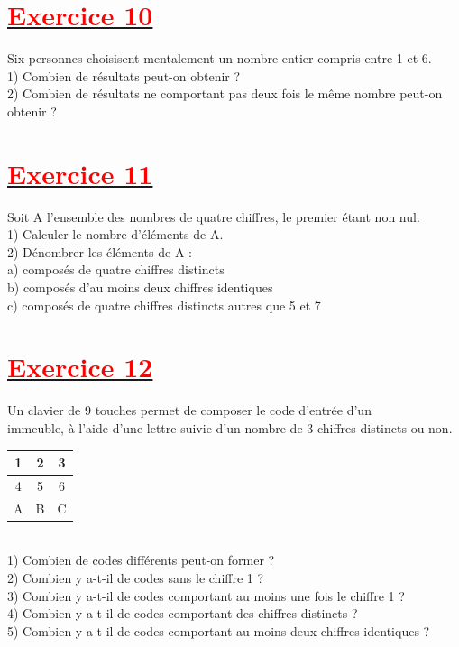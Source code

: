 \documentclass[12pt,a4paper]{article}
\begin{document}
\section*{\underline{\textbf{\textcolor{red}{Exercice 10}}}}
Six personnes choisisent mentalement un nombre entier compris entre 1 et 6.\\
1) Combien de résultats peut-on obtenir ?\\
2) Combien de résultats ne comportant pas deux fois le même nombre peut-on obtenir ?
\section*{\underline{\textbf{\textcolor{red}{Exercice 11}}}}
Soit A l'ensemble des nombres de quatre chiffres, le premier étant non nul.\\
1) Calculer le nombre d'éléments de A.\\
2) Dénombrer les éléments de A :\\
a) composés de quatre chiffres distincts\\
b) composés d'au moins deux chiffres identiques\\
c) composés de quatre chiffres distincts autres que 5 et 7\\
\section*{\underline{\textbf{\textcolor{red}{Exercice 12}}}}
Un clavier de 9 touches permet de composer le code d’entrée d’un\\ immeuble, à l’aide d’une lettre suivie d’un nombre de 3 chiffres distincts ou non.\\
\begin{table}[h]
\centering
\begin{tabular}{|c|c|c|}
\hline
1 & 2 & 3 \\
\hline
4 & 5 & 6 \\
\hline
A & B & C \\
\hline
\end{tabular}
\end{table}\\
1) Combien de codes différents peut-on former ?\\
2) Combien y a-t-il de codes sans le chiffre 1 ?\\
3) Combien y a-t-il de codes comportant au moins une fois le chiffre 1 ?\\
4) Combien y a-t-il de codes comportant des chiffres distincts ?\\
5) Combien y a-t-il de codes comportant au moins deux chiffres identiques ?\\
\end{document}
